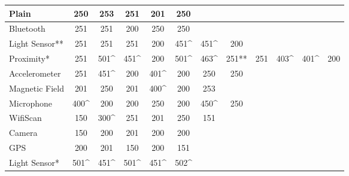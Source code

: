 \begin{table}
    \begin{tabular}{| l | c | c | c | c | c | c | c | c | c | c | c |}
    \hline
    Plain          & 250  & 253  & 251  & 201  & 250  & ~          & ~     & ~   & ~    & ~    & ~   \\\hline
    Bluetooth      & 251  & 251  & 200  & 250  & 250  & ~         & ~     & ~   & ~    & ~    & ~  \\\hline
    Light Sensor** & 251  & 251  & 251  & 200  & 451\^ & 451\^        & 200   & ~ & ~    & ~    & ~  \\ \hline
    Proximity*     & 251  & 501\^ & 451\^ & 200  & 501\^ & 463\^        & 251** & 251 & 403\^ & 401\^ & 200 \\ \hline
    Accelerometer  & 251  & 451\^ & 200  & 401\^ & 200  & 250          & 250   & ~ & ~    & ~    & ~  \\ \hline
    Magnetic Field & 201  & 250  & 201  & 400\^ & 200  & 253          & ~   & ~   & ~    & ~    & ~   \\ \hline
    Microphone     & 400\^ & 200  & 200  & 250  & 200  & 450\^        & 250   & ~ & ~    & ~    & ~   \\ \hline
    WifiScan       & 150  & 300\^ & 251  & 201  & 250  & 151   & ~ & ~    & ~    & ~   \\ \hline
    Camera         & 150  & 200  & 201  & 200  & 200  & ~          & ~     & ~   & ~    & ~    & ~   \\ \hline
    GPS            & 200  & 201  & 150  & 200  & 151  & ~          & ~     & ~   & ~    & ~    & ~   \\ \hline
    Light Sensor*  & 501\^ & 451\^ & 501\^ & 451\^ & 502\^ & ~          & ~     & ~   & ~    & ~    & ~  \\ \hline
    \end{tabular}
\end{table}